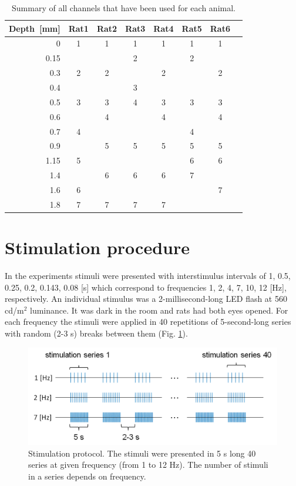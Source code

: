 \documentclass{pracalicmgr}
\begin{document}
 	\begin{table}[H]
	\caption{Summary of all channels that have been used for each animal.}
	\begin{center}
		\begin{tabularx}{0.9\textwidth}{R C C C C C C C}
			\toprule
			\textbf{Depth~[mm]} & \textbf{Rat1} & \textbf{Rat2} & \textbf{Rat3} & \textbf{Rat4} & \textbf{Rat5} & \textbf{Rat6} \\
			 & 1 & 1 & 1 & 1 & 1 & 1 \\
			0.15 &  &  & 2 & & 2&  \\
			0.3 & 2 & 2 &  & 2 & & 2 \\
			0.4 &  &  & 3 &  &  &  \\
			0.5 & 3 & 3 &4  & 3 & 3 & 3 \\
			0.6 & & 4 &  & 4 & & 4 \\
			0.7 & 4 &  &  &  & 4 &  \\
			0.9 & & 5 & 5 & 5 & 5& 5 \\
			1.15 & 5 &  &  &  & 6 & 6 \\
			1.4 & & 6 & 6 & 6 & 7 &  \\
			1.6 & 6 &  &  &  & & 7 \\
			1.8 & 7 & 7 & 7 & 7 & &  \\
			\bottomrule
		\end{tabularx}
	\end{center}
	\label{tab:chosen_chan}
	\end{table}
 	\newpage
 	\section{Stimulation procedure}
 	In the experiments stimuli were presented with interstimulus intervals of  1, 0.5, 0.25, 0.2, 0.143, 0.08 [s] which correspond to frequencies 1, 2, 4, 7, 10, 12 [Hz], respectively. An individual stimulus was a 2-millisecond-long LED flash at 560 cd/m$^2$ luminance. It was dark in the room and rats had both eyes opened. For each frequency the stimuli were applied in 40 repetitions of 5-second-long series with random (2-3 s) breaks between them (Fig. \ref{rys:stimuli}).
 	\begin{figure}[htbp]
 		\begin{center}
 			\includegraphics[scale=0.5]{paradigms.png}
 		\end{center}
 		\caption{ Stimulation protocol. The stimuli were presented in 5 s long 40 series at given frequency (from 1 to 12 Hz). The number of stimuli in a series depends on frequency.}
 		\label{rys:stimuli}
 	\end{figure} 
\end{document}
